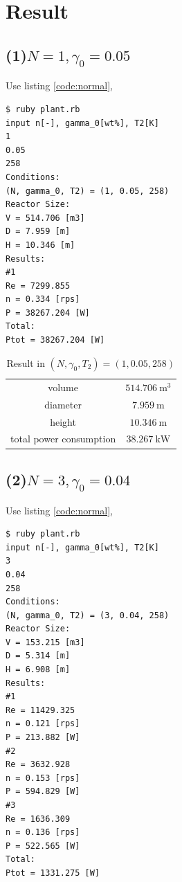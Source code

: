 \documentclass[a4paper,titlepage]{article}
\begin{document}
\newpage

  \section{Result}

  \subsection*{(1)$N=1, \gamma_0=0.05$}
  Use listing \ref{code:normal},
  \begin{screen}
    \begin{verbatim}
$ ruby plant.rb
input n[-], gamma_0[wt%], T2[K]
1
0.05
258
Conditions:
(N, gamma_0, T2) = (1, 0.05, 258)
Reactor Size:
V = 514.706 [m3]
D = 7.959 [m]
H = 10.346 [m]
Results:
#1
Re = 7299.855
n = 0.334 [rps]
P = 38267.204 [W]
Total:
Ptot = 38267.204 [W]\end{verbatim}
  \end{screen}

  \begin{table}[htbp]
    \centering
    \begin{tabular}{cc}\hline
      volume & $\SI{514.706}{\cubic\meter}$ \\
      diameter & $\SI{7.959}{\meter}$ \\
      height & $\SI{10.346}{\meter}$ \\
      total power consumption & $\SI{38.267}{\kilo\watt}$ \\ \hline
    \end{tabular}
    \caption{Result in $(N, \gamma_0, T_2) = (1, 0.05, 258)$}
  \end{table}

\newpage

  \subsection*{(2)$N=3, \gamma_0=0.04$}
  Use listing \ref{code:normal},
  \begin{screen}
    \begin{verbatim}
$ ruby plant.rb
input n[-], gamma_0[wt%], T2[K]
3
0.04
258
Conditions:
(N, gamma_0, T2) = (3, 0.04, 258)
Reactor Size:
V = 153.215 [m3]
D = 5.314 [m]
H = 6.908 [m]
Results:
#1
Re = 11429.325
n = 0.121 [rps]
P = 213.882 [W]
#2
Re = 3632.928
n = 0.153 [rps]
P = 594.829 [W]
#3
Re = 1636.309
n = 0.136 [rps]
P = 522.565 [W]
Total:
Ptot = 1331.275 [W]\end{verbatim}
  \end{screen}
\end{document}
